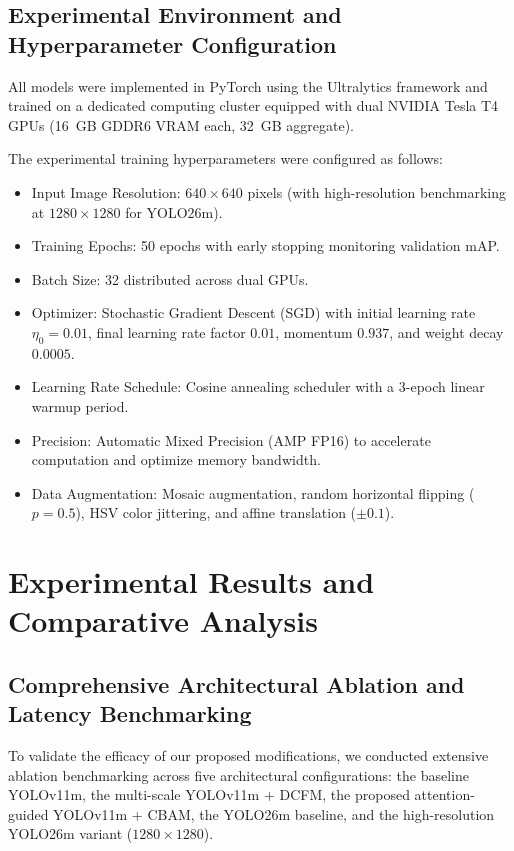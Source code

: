 \documentclass[pdflatex,sn-mathphys]{sn-jnl}
\begin{document}
\subsection{Experimental Environment and Hyperparameter Configuration}
All models were implemented in PyTorch using the Ultralytics framework and trained on a dedicated computing cluster equipped with dual NVIDIA Tesla T4 GPUs (16~GB GDDR6 VRAM each, 32~GB aggregate). 

The experimental training hyperparameters were configured as follows:
\begin{itemize}
    \item Input Image Resolution: $640 \times 640$ pixels (with high-resolution benchmarking at $1280 \times 1280$ for YOLO26m).
    \item Training Epochs: 50 epochs with early stopping monitoring validation mAP.
    \item Batch Size: 32 distributed across dual GPUs.
    \item Optimizer: Stochastic Gradient Descent (SGD) with initial learning rate $\eta_0 = 0.01$, final learning rate factor $0.01$, momentum $0.937$, and weight decay $0.0005$.
    \item Learning Rate Schedule: Cosine annealing scheduler with a 3-epoch linear warmup period.
    \item Precision: Automatic Mixed Precision (AMP FP16) to accelerate computation and optimize memory bandwidth.
    \item Data Augmentation: Mosaic augmentation, random horizontal flipping ($p=0.5$), HSV color jittering, and affine translation ($\pm 0.1$).
\end{itemize}

\section{Experimental Results and Comparative Analysis}\label{sec:results}

\subsection{Comprehensive Architectural Ablation and Latency Benchmarking}
To validate the efficacy of our proposed modifications, we conducted extensive ablation benchmarking across five architectural configurations: the baseline YOLOv11m, the multi-scale YOLOv11m + DCFM, the proposed attention-guided YOLOv11m + CBAM, the YOLO26m baseline, and the high-resolution YOLO26m variant ($1280 \times 1280$).
\end{document}
